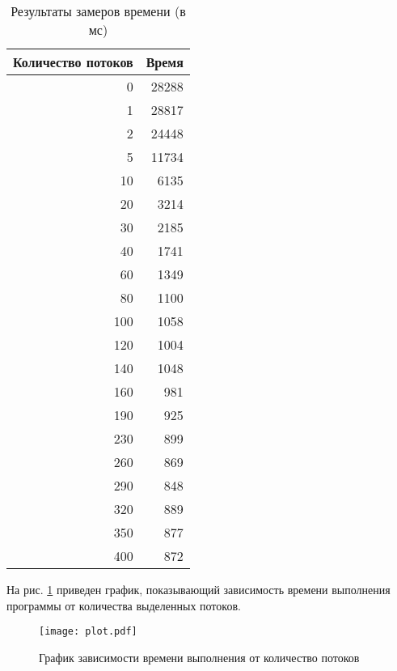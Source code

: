 \begin{table}[h!]
  \caption{\label{table:speed} Результаты замеров времени (в мс)}
  \begin{center}
    \begin{tabular}{|r|r|}
      \hline
      Количество потоков & Время\\ \hline
		0 & 28288 \\ \hline
		1 & 28817 \\ \hline
		2 & 24448 \\ \hline
		5 & 11734 \\ \hline
		10 & 6135 \\ \hline
		20 & 3214 \\ \hline
		30 & 2185 \\ \hline
		40 & 1741 \\ \hline
		60 & 1349 \\ \hline
		80 & 1100 \\ \hline
		100 & 1058 \\ \hline
		120 & 1004 \\ \hline
		140 & 1048 \\ \hline
		160 & 981 \\ \hline
		190 & 925 \\ \hline
		230 & 899 \\ \hline
		260 & 869 \\ \hline
		290 & 848 \\ \hline
		320 & 889 \\ \hline
		350 & 877 \\ \hline
		400 & 872 \\ \hline
    \end{tabular}
  \end{center}
\end{table}

\newpage

На рис. \ref{img:plot} приведен график, показывающий зависимость времени выполнения программы от количества выделенных потоков.

\begin{figure}[h!]
	\centering
    \texttt{[image: plot.pdf]}
    \caption{График зависимости времени выполнения от количество потоков}
    \label{img:plot}
\end{figure}

\newpage